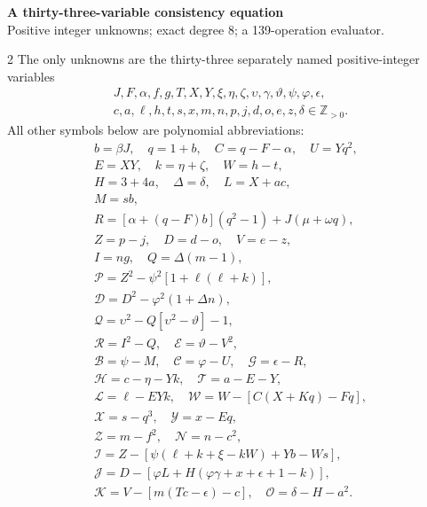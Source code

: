 \documentclass[10pt]{article}
\begin{document}
\begin{center}
{\large\bfseries A thirty-three-variable consistency equation}\\[-1pt]
{\small Positive integer unknowns; exact degree 8; a 139-operation evaluator.}
\end{center}\vspace{-8pt}
\begin{multicols}{2}
\fontsize{8.6}{9.1}\selectfont
The only unknowns are the thirty-three separately named positive-integer variables
\[
\begin{gathered}J,F,\alpha,f,g,T,X,Y,\xi,\eta,\zeta,\upsilon,\gamma,\vartheta,\psi,\varphi,\epsilon,\\
c,a,\ell,h,t,s,x,m,n,p,j,d,o,e,z,\delta\in\mathbb Z_{>0}.\end{gathered}
\]
All other symbols below are polynomial abbreviations:
\[
\begin{gathered}
b=\beta J,\quad q=1+b,\quad C=q-F-\alpha,\quad U=Yq^2,\\
E=XY,\quad k=\eta+\zeta,\quad W=h-t,\\
H=3+4a,\quad\Delta=\delta,\quad L=X+ac,\\
M=sb,\\
R=[\alpha+(q-F)b](q^2-1)+J(\mu+\omega q),\\
Z=p-j,\quad D=d-o,\quad V=e-z,\\
I=ng,\quad Q=\Delta(m-1),\\
\mathcal{P}=Z^2-\psi^2[1+\ell(\ell+k)],\\
\mathcal{D}=D^2-\varphi^2(1+\Delta n),\\
\mathcal{Q}=\upsilon^2-Q[\upsilon^2-\vartheta]-1,\\
\mathcal{R}=I^2-Q,\quad \mathcal{E}=\vartheta-V^2,\\
\mathcal{B}=\psi-M,\quad \mathcal{C}=\varphi-U,\quad \mathcal{G}=\epsilon-R,\\
\mathcal{H}=c-\eta-Yk,\quad \mathcal{T}=a-E-Y,\\
\mathcal{L}=\ell-EYk,\quad \mathcal{W}=W-[C(X+Kq)-Fq],\\
\mathcal{X}=s-q^3,\quad \mathcal{Y}=x-Eq,\\
\mathcal{Z}=m-f^2,\quad \mathcal{N}=n-c^2,\\
\mathcal{I}=Z-[\psi(\ell+k+\xi-kW)+Yb-Ws],\\
\mathcal{J}=D-[\varphi L+H(\varphi\gamma+x+\epsilon+1-k)],\\
\mathcal{K}=V-[m(Tc-\epsilon)-c],\quad\mathcal{O}=\delta-H-a^2.
\end{gathered}
\]
\end{multicols}
\end{document}
